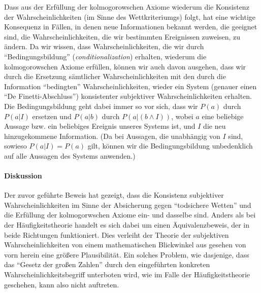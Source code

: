 Dass aus der Erfüllung der kolmogorowschen Axiome wiederum die Konsistenz der
Wahrscheinlichkeiten (im Sinne des Wettkriteriumgs) folgt, hat eine wichtige
Konsequenz in Fällen, in denen neue Informationen bekannt werden, die geeignet
sind, die Wahrscheinlichkeiten, die wir bestimmten Ereignissen zuweisen, zu
ändern. Da wir wissen, dass Wahrscheinlichkeiten, die wir durch
"`Bedingungsbildung"' ({\em conditionalization}) erhalten, wiederum die
kolmogorowschen Axiome erfüllen, können wir auch davon ausgehen, dass wir durch
die Ersetzung sämtlicher Wahrscheinlichkeiten mit den durch die Information
"`bedingten"' Wahrscheinlichkeiten, wieder ein System (genauer einen "`De
Finetti-Abschluss"') konsistenter subjektiver Wahrscheinlichkeiten erhalten.
Die Bedingungsbildung geht dabei immer so vor sich, dass wir $P(a)$ durch
$P(a|I)$ ersetzen und $P(a|b)$ durch $P(a|(b \wedge I))$, wobei $a$ eine
beliebige Aussage bzw. ein beliebiges Ereignis unseres Systems ist, und $I$ die
neu hinzugekommene Information. (Da bei Aussagen, die unabhängig von $I$ sind,
sowieso $P(a|I) = P(a)$ gilt, können wir die Bedingungsbildung unbedenklich
auf alle Aussagen des Systems anwenden.)

\paragraph{Diskussion}

Der zuvor geführte Beweis hat gezeigt, dass die Konsistenz subjektiver
Wahrscheinlichkeiten im Sinne der Absicherung gegen "`todsichere Wetten"' und die Erfüllung der
kolmogorwschen Axiome ein- und dasselbe sind. Anders als bei der
Häufigkeitstheorie handelt es sich dabei um einen Äquivalenzbeweis, der in
beide Richtungen funktioniert. Dies verleiht der Theorie der subjektiven
Wahrscheinlichkeiten von einem mathematischen Blickwinkel aus gesehen von vorn
herein eine größere Plausibilität. Ein solches Problem, wie dasjenige, dass das
"`Gesetz der großen Zahlen"' durch den eingeführten konkreten
Wahrscheinlichkeitsbegriff unterboten wird, wie im Falle der
Häufigkeitstheorie geschehen, kann also nicht auftreten.

